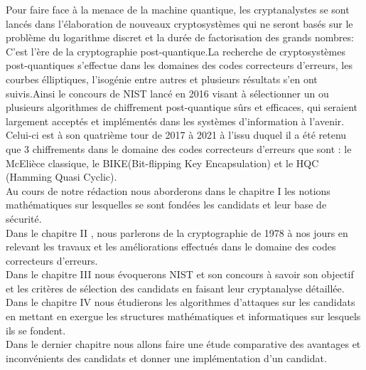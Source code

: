 \documentclass[12pt,openany]{report}
\begin{document}
Pour faire face à la menace de la machine quantique,\hspace{0.2cm} les cryptanalystes se sont lancés dans l'élaboration de nouveaux cryptosystèmes qui ne seront basés sur le problème du logarithme discret et la durée de factorisation des grands nombres:\hspace{0.2cm} C'est l'ère de la cryptographie post-quantique.\hspace{0.2cm}La recherche de cryptosystèmes post-quantiques s'effectue dans les domaines des codes correcteurs d'erreurs,\hspace{0.2cm} les courbes élliptiques,\hspace{0.2cm} l'isogénie entre autres et plusieurs résultats s'en ont suivis.\hspace{0.2cm}Ainsi le concours de NIST lancé en 2016 visant à sélectionner un ou plusieurs algorithmes de chiffrement post-quantique sûrs et efficaces,\hspace{0.2cm} qui seraient largement acceptés et implémentés dans les systèmes d'information à l'avenir.\hspace{0.3cm} Celui-ci est à son quatrième tour de 2017 à 2021 à l'issu duquel il a été retenu que 3 chiffrements dans le domaine des codes correcteurs d'erreurs que sont : le McElièce classique, \hspace{0.2cm}le BIKE(Bit-flipping Key Encapsulation) et le HQC (Hamming Quasi Cyclic). \\
Au cours de notre rédaction nous aborderons dans le chapitre I les notions mathématiques sur lesquelles se sont fondées les candidats et leur base de sécurité. \\ Dans le chapitre II , nous parlerons de la cryptographie de 1978 à nos jours en relevant les travaux et les améliorations effectués dans le domaine des codes correcteurs d'erreurs.\\
Dans le chapitre III nous évoquerons   NIST et son concours à savoir son objectif et les critères de sélection des candidats en  faisant leur cryptanalyse détaillée. \\ Dans le chapitre IV nous étudierons les algorithmes d'attaques sur les candidats  en mettant en exergue les structures mathématiques et informatiques sur lesquels ils se fondent.\\ Dans le dernier chapitre nous allons faire une étude comparative des avantages et inconvénients des candidats et donner une implémentation d'un candidat.
\end{document}
